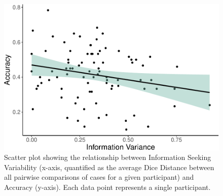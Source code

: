 \documentclass[a4paper, nobind]{templates/ociamthesis}
\begin{document}
\begin{figure}[H]

{\centering \includegraphics[width=1\linewidth]{_main_files/figure-latex/accVarPlot-1} 

}

\caption[Online Study: Accuracy Plotted Against Information Seeking Variability (Scatter Plot)]{Scatter plot showing the relationship between Information Seeking Variability (x-axis, quantified as the average Dice Distance between all pairwise comparisons of cases for a given participant) and Accuracy (y-axis). Each data point represents a single participant.}\label{fig:accVarPlot}
\end{figure}
\end{document}
